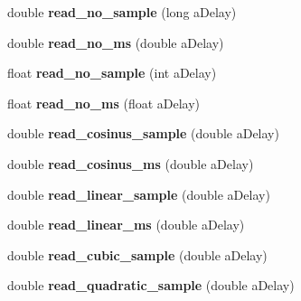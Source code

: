 \begin{DoxyCompactItemize}
\item 
\hypertarget{class_cicm_filter_delay_a05697341db16629af90d4ebe68378d9b}{double {\bfseries read\-\_\-no\-\_\-sample} (long a\-Delay)}\label{class_cicm_filter_delay_a05697341db16629af90d4ebe68378d9b}

\item 
\hypertarget{class_cicm_filter_delay_aab4bec2461c4630fe9874a988be89df8}{double {\bfseries read\-\_\-no\-\_\-ms} (double a\-Delay)}\label{class_cicm_filter_delay_aab4bec2461c4630fe9874a988be89df8}

\item 
\hypertarget{class_cicm_filter_delay_a1f848285750bb1243d818e62394f601b}{float {\bfseries read\-\_\-no\-\_\-sample} (int a\-Delay)}\label{class_cicm_filter_delay_a1f848285750bb1243d818e62394f601b}

\item 
\hypertarget{class_cicm_filter_delay_a42f9f984198c19d47a520cdd5dc0bcc3}{float {\bfseries read\-\_\-no\-\_\-ms} (float a\-Delay)}\label{class_cicm_filter_delay_a42f9f984198c19d47a520cdd5dc0bcc3}

\item 
\hypertarget{class_cicm_filter_delay_a1464c4cc9d4db5a06705c436528e0044}{double {\bfseries read\-\_\-cosinus\-\_\-sample} (double a\-Delay)}\label{class_cicm_filter_delay_a1464c4cc9d4db5a06705c436528e0044}

\item 
\hypertarget{class_cicm_filter_delay_a0fd8dcd10a42b84977b82f91014df5e4}{double {\bfseries read\-\_\-cosinus\-\_\-ms} (double a\-Delay)}\label{class_cicm_filter_delay_a0fd8dcd10a42b84977b82f91014df5e4}

\item 
\hypertarget{class_cicm_filter_delay_aec5b5fb34b142d2c7a91696dac805761}{double {\bfseries read\-\_\-linear\-\_\-sample} (double a\-Delay)}\label{class_cicm_filter_delay_aec5b5fb34b142d2c7a91696dac805761}

\item 
\hypertarget{class_cicm_filter_delay_aa6d7bbffaf1efb051e6e7c5db580ed02}{double {\bfseries read\-\_\-linear\-\_\-ms} (double a\-Delay)}\label{class_cicm_filter_delay_aa6d7bbffaf1efb051e6e7c5db580ed02}

\item 
\hypertarget{class_cicm_filter_delay_aabed01c4b36b58f4a0279c06cad20e26}{double {\bfseries read\-\_\-cubic\-\_\-sample} (double a\-Delay)}\label{class_cicm_filter_delay_aabed01c4b36b58f4a0279c06cad20e26}

\item 
\hypertarget{class_cicm_filter_delay_a4af21f3e38c1221313c2a5e39c8a4038}{double {\bfseries read\-\_\-quadratic\-\_\-sample} (double a\-Delay)}\label{class_cicm_filter_delay_a4af21f3e38c1221313c2a5e39c8a4038}


\end{DoxyCompactItemize}
